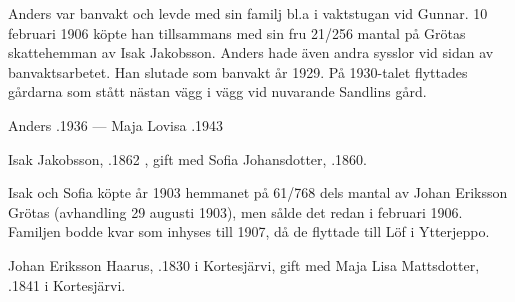 Anders var banvakt och levde med sin familj bl.a i vaktstugan vid Gunnar. 10 februari 1906 köpte han tillsammans med sin fru 21/256 mantal på Grötas skattehemman av Isak Jakobsson. Anders hade även andra sysslor vid sidan av banvaktsarbetet. Han slutade som banvakt år 1929. På 1930-talet flyttades gårdarna som stått nästan vägg i vägg vid nuvarande Sandlins gård.

Anders .1936  ---  Maja Lovisa .1943


Isak Jakobsson, .1862 , gift med Sofia Johansdotter, .1860.
\begin{jhchildren}
  \item {}
  \item {}
  \item {}
  \item {}
  \item {}
\end{jhchildren}

Isak och Sofia köpte år 1903 hemmanet på 61/768 dels mantal av Johan Eriksson Grötas (avhandling 29 augusti 1903), men sålde det redan i februari 1906. Familjen bodde kvar som inhyses till 1907, då de flyttade till Löf i Ytterjeppo.


Johan Eriksson Haarus, .1830 i Kortesjärvi, gift med Maja Lisa Mattsdotter, .1841 i Kortesjärvi.
\begin{jhchildren}
  \item {}
  \item {}
  \item {}
  \item {}
  \item {}
  \item {}
  \item {}
\end{jhchildren}


